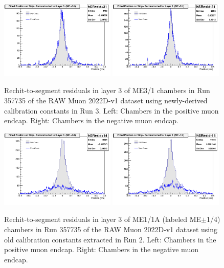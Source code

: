 \begin{figure}[H]
    \centering
    \includegraphics[width=0.49\textwidth]{Images/DetectorPerformance/run_10000012_oldME11A/hSResidplus31.png}
    \includegraphics[width=0.49\textwidth]{Images/DetectorPerformance/run_10000012_oldME11A/hSResidminus31.png}
    \caption{Rechit-to-segment residuals in layer 3 of ME3/1 chambers in Run 357735 of the RAW Muon 2022D-v1 dataset using newly-derived calibration constants in Run 3. Left: Chambers in the positive muon endcap. Right: Chambers in the negative muon endcap.}
    \label{fig:CalibVal2}
\end{figure}

\begin{figure}[H]
    \centering
    \includegraphics[width=0.49\textwidth]{Images/DetectorPerformance/run_10000012_oldME11A/hSResidplus14.png}
    \includegraphics[width=0.49\textwidth]{Images/DetectorPerformance/run_10000012_oldME11A/hSResidminus14.png}
    \caption{Rechit-to-segment residuals in layer 3 of ME1/1A (labeled ME$\pm$1/4) chambers in Run 357735 of the RAW Muon 2022D-v1 dataset using old calibration constants extracted in Run 2. Left: Chambers in the positive muon endcap. Right: Chambers in the negative muon endcap.}
    \label{fig:CalibVal2ME11A}
\end{figure}

